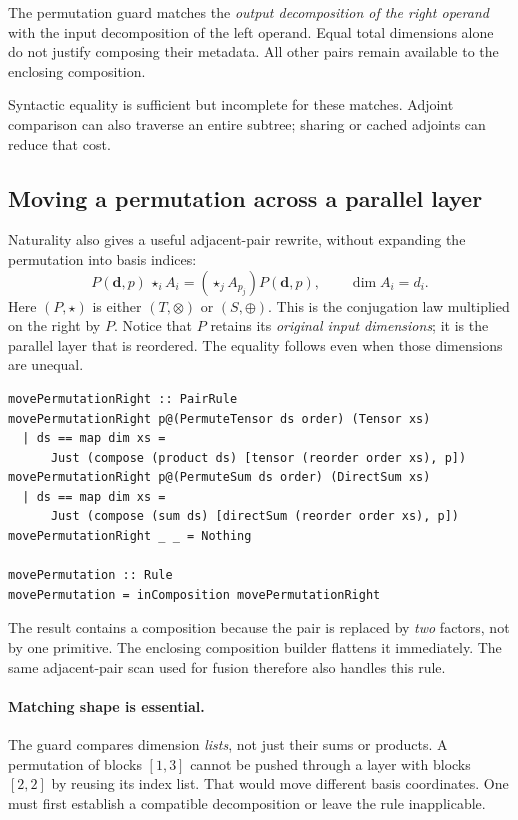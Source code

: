 \documentclass[11pt,a4paper]{article}
\newcommand{\ds}{\boldsymbol d}
\begin{document}
The permutation guard matches the \emph{output decomposition of the
right operand} with the input decomposition of the left operand.
Equal total dimensions alone do not justify composing their metadata.
All other pairs remain available to the enclosing composition.

Syntactic equality is sufficient but incomplete for these matches.
Adjoint comparison can also traverse an entire subtree; sharing or cached
adjoints can reduce that cost.

\subsection{Moving a permutation across a parallel layer}

Naturality also gives a useful adjacent-pair rewrite, without expanding
the permutation into basis indices:
\[
 P(\ds,p)\,\mathop{\star}_i A_i
 =\left(\mathop{\star}_j A_{p_j}\right)P(\ds,p),
 \qquad \dim A_i=d_i.
\]
Here $(P,\star)$ is either $(T,\otimes)$ or $(S,\oplus)$. This is the
conjugation law multiplied on the right by $P$. Notice that $P$ retains
its \emph{original input dimensions}; it is the parallel layer that is
reordered. The equality follows even when those dimensions are unequal.

\begin{lstlisting}
movePermutationRight :: PairRule
movePermutationRight p@(PermuteTensor ds order) (Tensor xs)
  | ds == map dim xs =
      Just (compose (product ds) [tensor (reorder order xs), p])
movePermutationRight p@(PermuteSum ds order) (DirectSum xs)
  | ds == map dim xs =
      Just (compose (sum ds) [directSum (reorder order xs), p])
movePermutationRight _ _ = Nothing

movePermutation :: Rule
movePermutation = inComposition movePermutationRight
\end{lstlisting}

The result contains a composition because the pair is replaced by
\emph{two} factors, not by one primitive. The enclosing composition
builder flattens it immediately. The same adjacent-pair scan used for
fusion therefore also handles this rule.

\paragraph{Matching shape is essential.}
The guard compares dimension \emph{lists}, not just their sums or
products. A permutation of blocks $[1,3]$ cannot be pushed through a
layer with blocks $[2,2]$ by reusing its index list. That would move
different basis coordinates. One must first establish a compatible
decomposition or leave the rule inapplicable.
\end{document}
